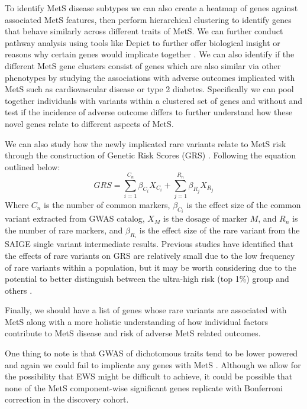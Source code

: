 \documentclass[11pt]{article}
\begin{document}
To identify MetS disease subtypes we can also  create a heatmap of genes against associated MetS features, then perform hierarchical clustering to identify genes that behave similarly across different traits of MetS. We can further conduct pathway analysis using tools like Depict to further offer biological insight or reasons why certain genes would implicate together \cite{Pers2015}. We can also identify if the different MetS gene clusters consist of genes which are also similar via other phenotypes by studying the associations with adverse outcomes implicated with MetS such as cardiovascular disease or type 2 diabetes. Specifically we can pool together individuals with variants within a clustered set of genes and without and test if the incidence of adverse outcome differs to further understand how these novel genes relate to different aspects of MetS.

We can also study how the newly implicated rare variants relate to MetS risk through the construction of Genetic Risk Scores (GRS) \cite{Lewis2020-ni,Kim2022}. Following the equation outlined below:
$$GRS = \sum_{i=1}^{C_n} \beta_{C_i}X_{C_i} + \sum_{j=1}^{R_n} \beta_{R_j}X_{R_j}$$
Where $C_n$ is the number of common markers, $\beta_{C_i}$ is the effect size of the common variant extracted from GWAS catalog, $X_M$ is the dosage of marker $M$, and $R_n$ is the number of rare markers, and $\beta_{R_i}$ is the effect size of the rare variant from the SAIGE single variant intermediate results. Previous studies have identified that the effects of rare variants on GRS are relatively small due to the low frequency of rare variants within a population, but it may be worth considering due to the potential to better distinguish between the ultra-high risk (top 1\%) group and others \cite{Kim2022}. 

Finally, we should have a list of genes whose rare variants are associated with MetS along with a more holistic understanding of how individual factors contribute to MetS disease and risk of adverse MetS related outcomes.

\noindent {}

One thing to note is that GWAS of dichotomous traits tend to be lower powered and again we could fail to implicate any genes with MetS \cite{Uffelmann2021}. Although we allow for the possibility that EWS might be difficult to achieve, it could be possible that none of the MetS component-wise significant genes replicate with Bonferroni correction in the discovery cohort.
\end{document}
